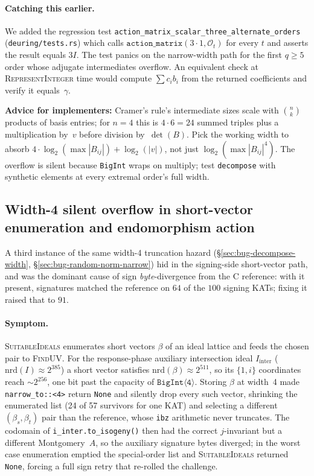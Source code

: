 \paragraph{Catching this earlier.}  We added the regression test
\texttt{action\_matrix\_scalar\_three\_alternate\_orders}
(\texttt{deuring/tests.rs}) which calls
$\texttt{action\_matrix}(3 \cdot 1, \mathcal{O}_t)$ for every $t$
and asserts the result equals $3 I$.  The test panics on the
narrow-width path for the first $q \geq 5$ order whose adjugate
intermediates overflow.  An equivalent check at
\textsc{RepresentInteger} time would compute
$\sum c_i b_i$ from the returned coefficients and verify it
equals~$\gamma$.

\noindent
\textbf{Advice for implementers:} Cramer's rule's intermediate
sizes scale with $\binom{n}{k}$ products of basis entries; for
$n = 4$ this is $4 \cdot 6 = 24$ summed triples plus a
multiplication by~$v$ before division by~$\det(B)$.  Pick the
working width to absorb $4 \cdot \log_2(\max |B_{ij}|) +
\log_2(|v|)$, not just $\log_2(\max |B_{ij}|^4)$.  The
overflow is silent because \texttt{BigInt} wraps on multiply;
test \texttt{decompose} with synthetic elements at every
extremal order's full width.

\subsection{Width-4 silent overflow in short-vector enumeration and
  endomorphism action}
\label{sec:bug-short-vector-width}

A third instance of the same width-4 truncation hazard
(\S\ref{sec:bug-decompose-width}, \S\ref{sec:bug-random-norm-narrow})
hid in the signing-side short-vector path, and was the dominant cause
of sign \emph{byte}-divergence from the C reference: with it present,
signatures matched the reference on $64$ of the $100$ signing KATs;
fixing it raised that to $91$.

\paragraph{Symptom.}  \textsc{SuitableIdeals} enumerates short vectors
$\beta$ of an ideal lattice and feeds the chosen pair to
\textsc{FindUV}.  For the response-phase auxiliary intersection ideal
$I_{\mathrm{inter}}$ ($\mathrm{nrd}(I) \approx 2^{385}$) a short vector
satisfies $\mathrm{nrd}(\beta) \approx 2^{511}$, so its $\{1, i\}$
coordinates reach $\sim\!2^{256}$, one bit past the capacity of
$\mathtt{BigInt\langle 4\rangle}$.  Storing $\beta$ at width~4 made
\texttt{narrow\_to::<4>} return \texttt{None} and silently drop every
such vector, shrinking the enumerated list (24 of 57 survivors for one
KAT) and selecting a different $(\beta_s, \beta_t)$ pair than the
reference, whose \texttt{ibz} arithmetic never truncates.  The
codomain of \texttt{i\_inter.to\_isogeny()} then had the correct
$j$-invariant but a different Montgomery~$A$, so the auxiliary
signature bytes diverged; in the worst case enumeration emptied the
special-order list and \textsc{SuitableIdeals} returned \texttt{None},
forcing a full sign retry that re-rolled the challenge.

